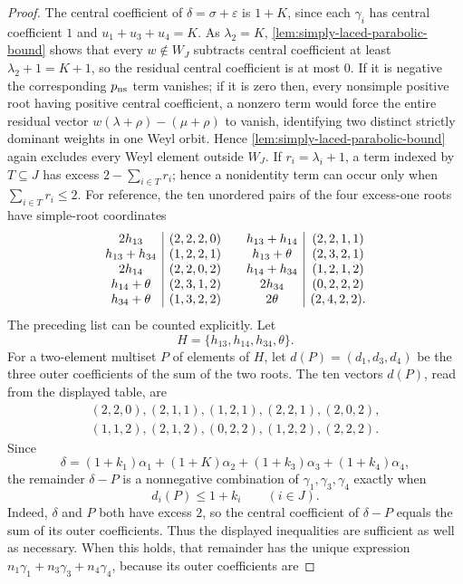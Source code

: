 \documentclass[11pt]{article}
\theoremstyle{definition}
\theoremstyle{remark}
\begin{document}
\begin{proof}
The central coefficient of $\delta=\sigma+\varepsilon$ is $1+K$, since each
$\gamma_i$ has central coefficient $1$ and $u_1+u_3+u_4=K$.  As
$\lambda_2=K$, \cref{lem:simply-laced-parabolic-bound} shows that every
$w\notin W_J$ subtracts central coefficient at least $\lambda_2+1=K+1$, so the
residual central coefficient is at most $0$.  If it is negative the
corresponding $p_{\rm ns}$ term vanishes; if it is zero then, every nonsimple
positive root having positive central coefficient, a nonzero term would force
the entire residual vector $w(\lambda+\rho)-(\mu+\rho)$ to vanish, identifying
two distinct strictly dominant weights in one Weyl orbit.  Hence
\cref{lem:simply-laced-parabolic-bound} again excludes every Weyl element
outside $W_J$.  If $r_i=\lambda_i+1$, a term indexed by
$T\subseteq J$ has excess $2-\sum_{i\in T}r_i$; hence a nonidentity term can
occur only when $\sum_{i\in T}r_i\le2$.  For reference, the ten unordered
pairs of the four excess-one roots have simple-root coordinates
\[
\begin{array}{c|c@{\qquad}c|c}
2h_{13}&(2,2,2,0)&h_{13}+h_{14}&(2,2,1,1)\\
h_{13}+h_{34}&(1,2,2,1)&h_{13}+\theta&(2,3,2,1)\\
2h_{14}&(2,2,0,2)&h_{14}+h_{34}&(1,2,1,2)\\
h_{14}+\theta&(2,3,1,2)&2h_{34}&(0,2,2,2)\\
h_{34}+\theta&(1,3,2,2)&2\theta&(2,4,2,2).
\end{array}
\]
The preceding list can be counted explicitly.  Let
\[
 H=\{h_{13},h_{14},h_{34},\theta\}.
\]
For a two-element multiset $P$ of elements of $H$, let
$d(P)=(d_1,d_3,d_4)$ be the three outer coefficients of the sum of the two
roots.  The ten vectors $d(P)$, read from the displayed table, are
\[
\begin{gathered}
 (2,2,0),(2,1,1),(1,2,1),(2,2,1),(2,0,2),\\
 (1,1,2),(2,1,2),(0,2,2),(1,2,2),(2,2,2).
\end{gathered}
\]
Since
\[
 \delta=(1+k_1)\alpha_1+(1+K)\alpha_2
       +(1+k_3)\alpha_3+(1+k_4)\alpha_4,
\]
the remainder $\delta-P$ is a nonnegative combination of
$\gamma_1,\gamma_3,\gamma_4$ exactly when
\[
 d_i(P)\le1+k_i\qquad(i\in J).
\]
Indeed, $\delta$ and $P$ both have excess $2$, so the central coefficient of
$\delta-P$ equals the sum of its outer coefficients.  Thus the displayed
inequalities are sufficient as well as necessary.
When this holds, that remainder has the unique expression
$n_1\gamma_1+n_3\gamma_3+n_4\gamma_4$, because its outer coefficients are

\end{proof}
\end{document}
